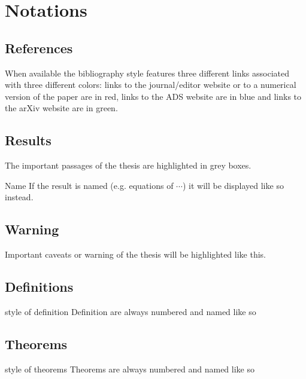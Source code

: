 \chapter*{Notations}

\section*{References}

When available the bibliography style features three different links associated with three different colors: links to the journal/editor website or to a numerical version of the paper are in \textcolor{LinkJournal}{red}, links to the ADS website are in \textcolor{LinkADS}{blue} and links to the arXiv website are in \textcolor{LinkArXiv}{green}.

\section*{Results}
\begin{result}
    The important passages of the thesis are highlighted in grey boxes.
\end{result}

\begin{tcresult*}{Name}
    If the result is named (e.g. equations of $\cdots$) it will be displayed like so instead.
\end{tcresult*}


\section*{Warning}
\begin{marker}
    Important caveats or warning of the thesis will be highlighted like this.
\end{marker}

\section*{Definitions}
\begin{tcdefinition}{style of definition}{}
Definition are always numbered and named like so
\end{tcdefinition}

\section*{Theorems}
\begin{tctheorem}{style of theorems}{}
Theorems are always numbered and named like so
\end{tctheorem}

